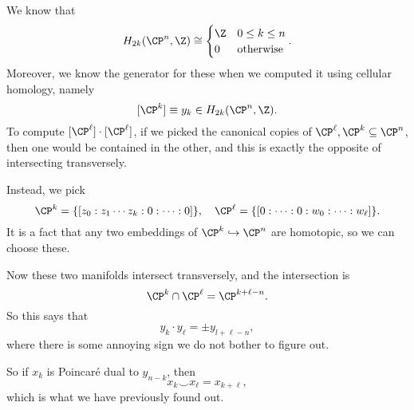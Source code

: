 \documentclass[a4paper]{article}
\begin{document}
\begin{eg}
  We know that
  \[
    H_{2k}(\CP^n, \Z) \cong
    \begin{cases}
      \Z & 0 \leq k \leq n\\
      0 & \text{otherwise}
    \end{cases}.
  \]
  Moreover, we know the generator for these when we computed it using cellular homology, namely
  \[
    [\CP^k] \equiv y_k \in H_{2k}(\CP^n, \Z).
  \]
  To compute $[\CP^\ell] \cdot [\CP^\ell]$, if we picked the canonical copies of $\CP^\ell, \CP^k \subseteq \CP^n$, then one would be contained in the other, and this is exactly the opposite of intersecting transversely.

  Instead, we pick
  \[
    \CP^k = \{[z_0:z_1 \cdots z_k:0:\cdots:0]\},\quad \CP^\ell = \{[0:\cdots : 0 : w_0 : \cdots : w_\ell]\}.
  \]
  It is a fact that any two embeddings of $\CP^k \hookrightarrow \CP^n$ are homotopic, so we can choose these.

  Now these two manifolds intersect transversely, and the intersection is
  \[
    \CP^k \cap \CP^\ell = \CP^{k + \ell - n}.
  \]
  So this says that
  \[
    y_k \cdot y_\ell = \pm y_{l + \ell - n},
  \]
  where there is some annoying sign we do not bother to figure out.

  So if $x_k$ is Poincar\'e dual to $y_{n - k}$, then
  \[
    x_k \smile x_\ell = x_{k + \ell},
  \]
  which is what we have previously found out.
\end{eg}
\end{document}
